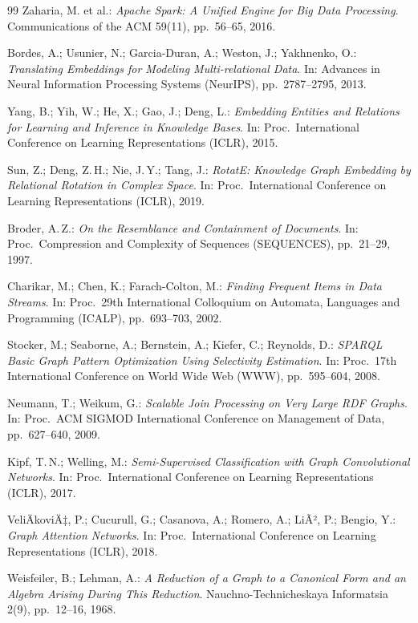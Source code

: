 ﻿\documentclass[a4paper,12pt]{article}
\theoremstyle{definition}
\begin{document}
\begin{thebibliography}{99}
Zaharia, M. et al.:
\textit{Apache Spark: A Unified Engine for Big Data Processing}.
Communications of the ACM 59(11), pp.\ 56--65, 2016.

Bordes, A.; Usunier, N.; Garcia-Duran, A.; Weston, J.; Yakhnenko, O.:
\textit{Translating Embeddings for Modeling Multi-relational Data}.
In: Advances in Neural Information Processing Systems (NeurIPS), pp.\ 2787--2795, 2013.

Yang, B.; Yih, W.; He, X.; Gao, J.; Deng, L.:
\textit{Embedding Entities and Relations for Learning and Inference in Knowledge Bases}.
In: Proc.\ International Conference on Learning Representations (ICLR), 2015.

Sun, Z.; Deng, Z.\,H.; Nie, J.\,Y.; Tang, J.:
\textit{RotatE: Knowledge Graph Embedding by Relational Rotation in Complex Space}.
In: Proc.\ International Conference on Learning Representations (ICLR), 2019.

Broder, A.\,Z.:
\textit{On the Resemblance and Containment of Documents}.
In: Proc.\ Compression and Complexity of Sequences (SEQUENCES), pp.\ 21--29, 1997.

Charikar, M.; Chen, K.; Farach-Colton, M.:
\textit{Finding Frequent Items in Data Streams}.
In: Proc.\ 29th International Colloquium on Automata, Languages and Programming (ICALP),
pp.\ 693--703, 2002.

Stocker, M.; Seaborne, A.; Bernstein, A.; Kiefer, C.; Reynolds, D.:
\textit{SPARQL Basic Graph Pattern Optimization Using Selectivity Estimation}.
In: Proc.\ 17th International Conference on World Wide Web (WWW), pp.\ 595--604, 2008.

Neumann, T.; Weikum, G.:
\textit{Scalable Join Processing on Very Large RDF Graphs}.
In: Proc.\ ACM SIGMOD International Conference on Management of Data,
pp.\ 627--640, 2009.

Kipf, T.\,N.; Welling, M.:
\textit{Semi-Supervised Classification with Graph Convolutional Networks}.
In: Proc.\ International Conference on Learning Representations (ICLR), 2017.

VeliÄkoviÄ‡, P.; Cucurull, G.; Casanova, A.; Romero, A.; LiÃ², P.; Bengio, Y.:
\textit{Graph Attention Networks}.
In: Proc.\ International Conference on Learning Representations (ICLR), 2018.

Weisfeiler, B.; Lehman, A.:
\textit{A Reduction of a Graph to a Canonical Form and an Algebra Arising
During This Reduction}. Nauchno-Technicheskaya Informatsia 2(9), pp.\ 12--16, 1968.


\end{thebibliography}
\end{document}

